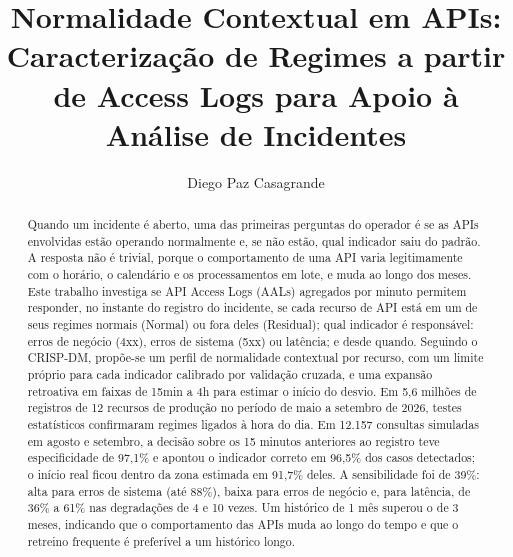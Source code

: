 \documentclass[sigconf,nonacm]{acmart}
\begin{document}
\title{Normalidade Contextual em APIs: Caracterização de Regimes a partir de Access Logs para Apoio à Análise de Incidentes}

\author{Diego Paz Casagrande}

\renewcommand{\shortauthors}{D. P. Casagrande}

\begin{abstract}
Quando um incidente é aberto, uma das primeiras perguntas do operador é se as APIs envolvidas estão operando normalmente e, se não estão, qual indicador saiu do padrão. A resposta não é trivial, porque o comportamento de uma API varia legitimamente com o horário, o calendário e os processamentos em lote, e muda ao longo dos meses. Este trabalho investiga se API Access Logs (AALs) agregados por minuto permitem responder, no instante do registro do incidente, se cada recurso de API está em um de seus regimes normais (Normal) ou fora deles (Residual); qual indicador é responsável: erros de negócio (4xx), erros de sistema (5xx) ou latência; e desde quando. Seguindo o CRISP-DM, propõe-se um perfil de normalidade contextual por recurso, com um limite próprio para cada indicador calibrado por validação cruzada, e uma expansão retroativa em faixas de 15min a 4h para estimar o início do desvio. Em 5,6 milhões de registros de 12 recursos de produção no período de maio a setembro de 2026, testes estatísticos confirmaram regimes ligados à hora do dia. Em 12.157 consultas simuladas em agosto e setembro, a decisão sobre os 15 minutos anteriores ao registro teve especificidade de 97,1\% e apontou o indicador correto em 96,5\% dos casos detectados; o início real ficou dentro da zona estimada em 91,7\% deles. A sensibilidade foi de 39\%: alta para erros de sistema (até 88\%), baixa para erros de negócio e, para latência, de 36\% a 61\% nas degradações de 4 e 10 vezes. Um histórico de 1 mês superou o de 3 meses, indicando que o comportamento das APIs muda ao longo do tempo e que o retreino frequente é preferível a um histórico longo.
\end{abstract}


\maketitle
\end{document}
